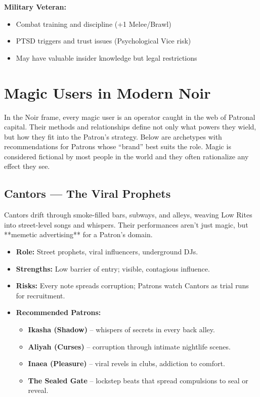 \documentclass[11pt]{article}
\begin{document}
\textbf{Military Veteran:}
\begin{itemize}
\item Combat training and discipline (+1 Melee/Brawl)
\item PTSD triggers and trust issues (Psychological Vice risk)
\item May have valuable insider knowledge but legal restrictions
\end{itemize}

\section{Magic Users in Modern Noir}
\label{sec:rites-users-noir}

In the Noir frame, every magic user is an operator caught in the web of Patronal capital. Their methods and relationships define not only what powers they wield, but how they fit into the Patron’s strategy. Below are archetypes with recommendations for Patrons whose “brand” best suits the role. Magic is considered fictional by most people in the world and they often rationalize any effect they see.

\subsection*{Cantors --- The Viral Prophets}
Cantors drift through smoke-filled bars, subways, and alleys, weaving Low Rites into street-level songs and whispers. Their performances aren’t just magic, but **memetic advertising** for a Patron’s domain.
\begin{itemize}
  \item \textbf{Role:} Street prophets, viral influencers, underground DJs.
  \item \textbf{Strengths:} Low barrier of entry; visible, contagious influence.
  \item \textbf{Risks:} Every note spreads corruption; Patrons watch Cantors as trial runs for recruitment.
  \item \textbf{Recommended Patrons:}
    \begin{itemize}
      \item \textbf{Ikasha (Shadow)} – whispers of secrets in every back alley.
      \item \textbf{Aliyah (Curses)} – corruption through intimate nightlife scenes.
      \item \textbf{Inaea (Pleasure)} – viral revels in clubs, addiction to comfort.
      \item \textbf{The Sealed Gate} – lockstep beats that spread compulsions to seal or reveal.
    \end{itemize}
\end{itemize}
\end{document}
